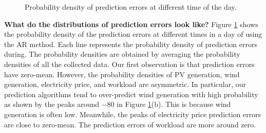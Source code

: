 \begin{figure}[pbth]
	\centering
	\caption{Probability density of prediction errors at different time of the day.}	
	\label{fig:hourlyDistribution}
\end{figure}

\textbf{What do the distributions of prediction errors look like?} Figure \ref{fig:hourlyDistribution} shows the probability density of the prediction errors at different times in a day of using the AR method. Each line represents the probability density of prediction errors during. The probability densities are obtained by averaging the probability densities of all the collected data. Our first observation is that prediction errors have zero-mean. However, the probability densities of PV generation, wind generation, electricity price, and workload are asymmetric. In particular, our prediction algorithms tend to over-predict wind generation with high probability as shown by the peaks around $-80$ in Figure \ref{fig:hourlyDistribution}(b). This is because wind generation is often low. Meanwhile, the peaks of electricity price prediction errors are close to zero-mean. The prediction errors of workload are more around zero. 

